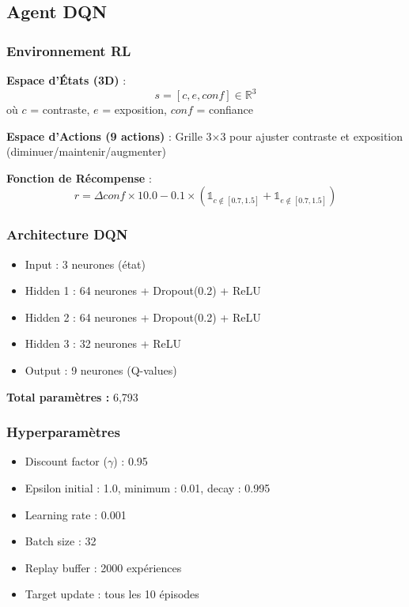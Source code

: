 \documentclass[12pt,a4paper]{article}
\begin{document}
\subsection{Agent DQN}

\subsubsection{Environnement RL}

\textbf{Espace d'États (3D)} :
\begin{equation}
s = [c, e, conf] \in \mathbb{R}^3
\end{equation}
où $c$ = contraste, $e$ = exposition, $conf$ = confiance

\textbf{Espace d'Actions (9 actions)} : Grille 3×3 pour ajuster contraste et exposition (diminuer/maintenir/augmenter)

\textbf{Fonction de Récompense} :
\begin{equation}
r = \Delta conf \times 10.0 - 0.1 \times (\mathbb{1}_{c \notin [0.7, 1.5]} + \mathbb{1}_{e \notin [0.7, 1.5]})
\end{equation}

\subsubsection{Architecture DQN}
\begin{itemize}
    \item Input : 3 neurones (état)
    \item Hidden 1 : 64 neurones + Dropout(0.2) + ReLU
    \item Hidden 2 : 64 neurones + Dropout(0.2) + ReLU
    \item Hidden 3 : 32 neurones + ReLU
    \item Output : 9 neurones (Q-values)
\end{itemize}

\textbf{Total paramètres :} 6,793

\subsubsection{Hyperparamètres}
\begin{itemize}
    \item Discount factor ($\gamma$) : 0.95
    \item Epsilon initial : 1.0, minimum : 0.01, decay : 0.995
    \item Learning rate : 0.001
    \item Batch size : 32
    \item Replay buffer : 2000 expériences
    \item Target update : tous les 10 épisodes
\end{itemize}
\end{document}
